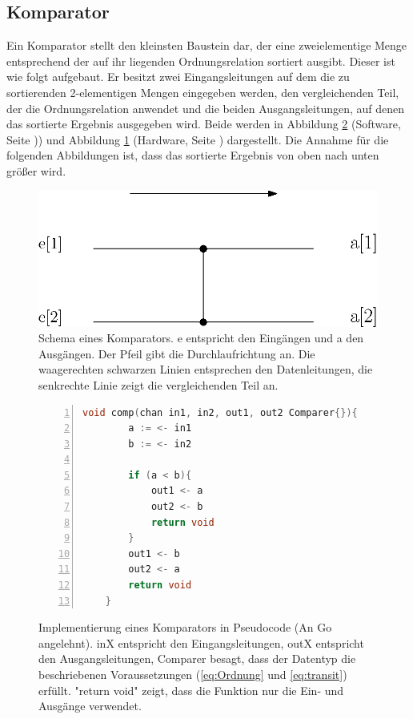 \documentclass[11pt]{article}
\begin{document}
\subsection{Komparator}
Ein Komparator stellt den kleinsten Baustein dar, der eine zweielementige Menge entsprechend der auf ihr liegenden Ordnungsrelation sortiert ausgibt. Dieser ist wie folgt aufgebaut. Er besitzt zwei Eingangsleitungen auf dem die zu sortierenden 2-elementigen Mengen eingegeben werden, den vergleichenden Teil, der die Ordnungsrelation anwendet und die beiden Ausgangsleitungen, auf denen das sortierte Ergebnis ausgegeben wird. Beide werden in Abbildung \ref{fig:kompsoft} (Software, Seite \pageref{fig:kompsoft})) und Abbildung \ref{fig:komparator} (Hardware, Seite \pageref{fig:komparator}) dargestellt. Die Annahme für die folgenden Abbildungen ist, dass das sortierte Ergebnis von oben nach unten größer wird.
\begin{figure}
\begin{center}
\includegraphics[scale=0.8]{Komparator1.eps}
\end{center}
\caption{Schema eines Komparators. e entspricht den Eingängen und a den Ausgängen. Der Pfeil gibt die Durchlaufrichtung an. Die waagerechten schwarzen Linien entsprechen den Datenleitungen, die senkrechte Linie zeigt die vergleichenden Teil an.}
\label{fig:komparator}
\end{figure}
\begin{figure}
\begin{lstlisting}[language=C,tabsize=4,numbers=left]
    void comp(chan in1, in2, out1, out2 Comparer{}){
        a := <- in1
        b := <- in2
        
        if (a < b){
            out1 <- a
            out2 <- b
            return void
        }
        out1 <- b
        out2 <- a
        return void
    }
\end{lstlisting}
\caption{Implementierung eines Komparators in Pseudocode (An Go angelehnt). inX entspricht den Eingangsleitungen, outX entspricht den Ausgangsleitungen, Comparer besagt, dass der Datentyp die beschriebenen Voraussetzungen (\eqref{eq:Ordnung} und \eqref{eq:transit}) erfüllt. "return void" zeigt, dass die Funktion nur die Ein- und Ausgänge verwendet.}
\label{fig:kompsoft}
\end{figure}
\FloatBarrier
\end{document}
